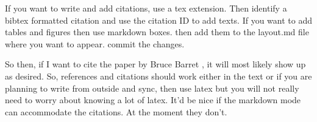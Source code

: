 If you want to write and add citations, use a tex extension. Then identify a bibtex formatted citation and use the citation ID to add texts. 
If you want to add tables and figures then use markdown boxes. 
then add them to the layout.md file where you want to appear. 
commit the changes. 

So then, if I want to cite the paper by Bruce Barret \cite{barrett2012meditation}, it will most likely show up as desired. So, references and citations should work either in the text or if you are planning to write from outside and sync, then use latex but you will not really need to worry about knowing a lot of latex. It'd be nice if the markdown mode can accommodate the citations. At the moment they don't. 
